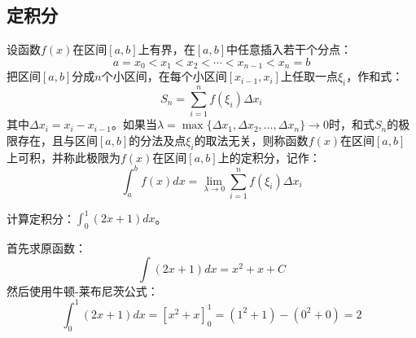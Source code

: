 \documentclass[oneside]{book}
\begin{document}
\newpage
\subsection{定积分}

\begin{definition}[定积分]
设函数$f(x)$在区间$[a,b]$上有界，在$[a,b]$中任意插入若干个分点：
\[
a = x_0 < x_1 < x_2 < \cdots < x_{n-1} < x_n = b
\]
把区间$[a,b]$分成$n$个小区间，在每个小区间$[x_{i-1}, x_i]$上任取一点$\xi_i$，作和式：
\[
S_n = \sum_{i=1}^{n} f(\xi_i) \Delta x_i
\]
其中$\Delta x_i = x_i - x_{i-1}$。如果当$\lambda = \max\{\Delta x_1, \Delta x_2, \ldots, \Delta x_n\} \to 0$时，和式$S_n$的极限存在，且与区间$[a,b]$的分法及点$\xi_i$的取法无关，则称函数$f(x)$在区间$[a,b]$上可积，并称此极限为$f(x)$在区间$[a,b]$上的定积分，记作：
\[
\int_{a}^{b} f(x)dx = \lim_{\lambda \to 0} \sum_{i=1}^{n} f(\xi_i) \Delta x_i
\]
\end{definition}

\begin{example}[定积分计算]
计算定积分：$\displaystyle \int_{0}^{1} (2x + 1)dx$。
\end{example}

\begin{answer}
首先求原函数：
\[
\int (2x + 1)dx = x^2 + x + C
\]
然后使用牛顿-莱布尼茨公式：
\[
\int_{0}^{1} (2x + 1)dx = \left[ x^2 + x \right]_{0}^{1} = (1^2 + 1) - (0^2 + 0) = 2
\]
\end{answer}
\end{document}
